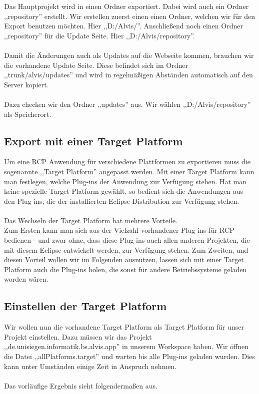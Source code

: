 \documentclass[10pt,a4paper,oneside]{scrbook}
\begin{document}
Das Hauptprojekt wird in einen Ordner exportiert. Dabei wird auch ein Ordner ,,repository'' erstellt. Wir erstellen zuerst einen einen Ordner, welchen wir für den Export benutzen möchten. Hier ,,D:/Alvis/''. Anschließend noch einen Ordner ,,repository'' für die Update Seite. Hier ,,D:/Alvis/repository''.
\\ \\
Damit die Änderungen auch als Updates auf die Webseite kommen, brauchen wir die vorhandene Update Seite. Diese befindet sich im Ordner ,,trunk/alvis/updates'' und wird in regelmäßigen Abständen automatisch auf den Server kopiert. 
\\ \\
Dazu checken wir den Ordner ,,updates'' aus. Wir wählen ,,D:/Alvis/repository'' als Speicherort.
\subsection{Export mit einer Target Platform}
Um eine RCP Anwendung für verschiedene Plattformen zu exportieren muss die sogenannte ,,Target Platform'' angepasst werden. Mit einer Target Platform kann man festlegen, welche Plug-ins der Anwendung zur Verfügung stehen. Hat man keine spezielle Target Platform gewählt, so bedient sich die Anwendungen aus den Plug-ins, die der installierten Eclipse Distribution zur Verfügung stehen.
\\
\\
Das Wechseln der Target Platform hat mehrere Vorteile. \\
Zum Ersten kann man sich aus der Vielzahl vorhandener Plug-ins für RCP bedienen - und zwar ohne, dass diese Plug-ins auch allen anderen Projekten, die mit diesem Eclipse entwickelt werden, zur Verfügung stehen.
Zum Zweiten, und diesen Vorteil wollen wir im Folgenden ausnutzen, lassen sich mit einer Target Platform auch die Plug-ins holen, die sonst für andere Betriebssysteme geladen worden wären.

\subsection{Einstellen der Target Platform}
Wir wollen nun die vorhandene Target Platform als Target Platform für unser Projekt einstellen. Dazu müssen wir das Projekt\\
,,de.unisiegen.informatik.bs.alvis.app'' in unserem Workspace haben. Wir öffnen die Datei ,,allPlatforms.target'' und warten bis alle Plug-ins geladen wurden. Dies kann unter Umständen einige Zeit in Anspruch nehmen. 
\\ \\
Das vorläufige Ergebnis sieht folgendermaßen aus.
\begin{center}
\end{center}
\end{document}
